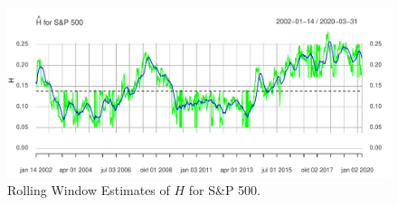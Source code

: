 \begin{figure}[H]
    \centering
    \includegraphics[scale=0.71]{fig/img/RealizedLib/rolling_H_75.pdf}
    \caption{Rolling Window Estimates of $H$ for S\&P 500.}
    \label{fig:fedfgrafmand}
\end{figure}

